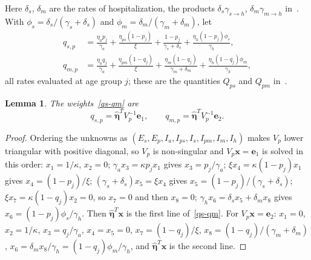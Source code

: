 \documentclass[11pt]{article}
\theoremstyle{plain}
\newtheorem{lemma}[theorem]{Lemma}
\theoremstyle{remark}
\numberwithin{equation}{section}
\begin{document}
Here $\delta_s$, $\delta_m$ are the rates of hospitalization, the products
$\delta_s\gamma_{s\to h}$, $\delta_m\gamma_{m\to h}$ in~\cite{2026Feng_Day_Glasser}.
With $\phi_s=\delta_s/(\gamma_s+\delta_s)$ and $\phi_m=\delta_m/(\gamma_m+\delta_m)$, let
\begin{equation}\label{qs-qm}
\begin{aligned}
q_{s,p}&=\frac{\eta_ap_j}{\gamma_a}+\frac{\eta_{ps}(1-p_j)}{\xi}+\frac{1-p_j}{\gamma_s+\delta_s}
+\frac{\eta_h(1-p_j)\phi_s}{\gamma_h},\\
q_{m,p}&=\frac{\eta_aq_j}{\gamma_a}+\frac{\eta_{pm}(1-q_j)}{\xi}+\frac{\eta_m(1-q_j)}{\gamma_m+\delta_m}
+\frac{\eta_h(1-q_j)\phi_m}{\gamma_h},
\end{aligned}
\end{equation}
all rates evaluated at age group $j$; these are the quantities $Q_{ps}$ and
$Q_{pm}$ in~\cite[Appendix~A]{2026Feng_Day_Glasser}.

\begin{lemma}\label{q-formula}
The weights~\eqref{qs-qm} are
\begin{equation}\label{q-def}
q_{s,p}=\widehat{\bm\eta}^TV_p^{-1}\bm e_1,\qquad
q_{m,p}=\widehat{\bm\eta}^TV_p^{-1}\bm e_2 .
\end{equation}
\end{lemma}
\begin{proof}
Ordering the unknowns as $(E_s,E_p,I_a,I_{ps},I_s,I_{pm},I_m,I_h)$ makes
$V_p$ lower triangular with positive diagonal, so $V_p$ is non-singular and
$V_p\bm x=\bm e_1$ is solved in this order: $x_1=1/\kappa$, $x_2=0$;
$\gamma_ax_3=\kappa p_jx_1$ gives $x_3=p_j/\gamma_a$;
$\xi x_4=\kappa(1-p_j)x_1$ gives $x_4=(1-p_j)/\xi$;
$(\gamma_s+\delta_s)x_5=\xi x_4$ gives $x_5=(1-p_j)/(\gamma_s+\delta_s)$;
$\xi x_7=\kappa(1-q_j)x_2=0$, so $x_7=0$ and then $x_8=0$;
$\gamma_hx_6=\delta_sx_5+\delta_mx_8$ gives $x_6=(1-p_j)\phi_s/\gamma_h$.
Then $\widehat{\bm\eta}^T\bm x$ is the first line of~\eqref{qs-qm}.
For $V_p\bm x=\bm e_2$: $x_1=0$, $x_2=1/\kappa$, $x_3=q_j/\gamma_a$,
$x_4=x_5=0$, $x_7=(1-q_j)/\xi$, $x_8=(1-q_j)/(\gamma_m+\delta_m)$,
$x_6=\delta_mx_8/\gamma_h=(1-q_j)\phi_m/\gamma_h$, and
$\widehat{\bm\eta}^T\bm x$ is the second line.
\end{proof}
\end{document}
